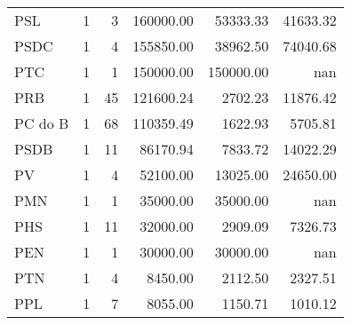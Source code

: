 \begin{tabular}{lrrrrr}
     PSL &                    1 &                    3 &   160000.00 &   53333.33 &                 41633.32 \\
    PSDC &                    1 &                    4 &   155850.00 &   38962.50 &                 74040.68 \\
     PTC &                    1 &                    1 &   150000.00 &  150000.00 &                      nan \\
     PRB &                    1 &                   45 &   121600.24 &    2702.23 &                 11876.42 \\
 PC do B &                    1 &                   68 &   110359.49 &    1622.93 &                  5705.81 \\
    PSDB &                    1 &                   11 &    86170.94 &    7833.72 &                 14022.29 \\
      PV &                    1 &                    4 &    52100.00 &   13025.00 &                 24650.00 \\
     PMN &                    1 &                    1 &    35000.00 &   35000.00 &                      nan \\
     PHS &                    1 &                   11 &    32000.00 &    2909.09 &                  7326.73 \\
     PEN &                    1 &                    1 &    30000.00 &   30000.00 &                      nan \\
     PTN &                    1 &                    4 &     8450.00 &    2112.50 &                  2327.51 \\
     PPL &                    1 &                    7 &     8055.00 &    1150.71 &                  1010.12 \\
\bottomrule
\end{tabular}
